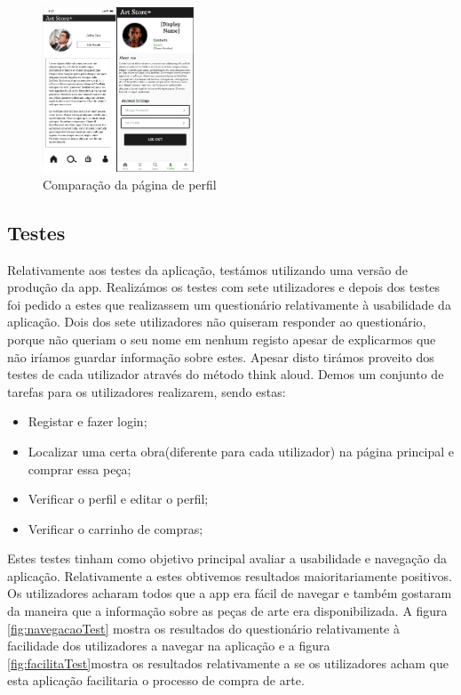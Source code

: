 \documentclass[conference]{IEEEtran}
\begin{document}
\begin{figure}[h]
    \centering
    \includegraphics[width=0.4\textwidth]{profile-early-vs-latest.png}
    \caption{Comparação da página de perfil}
    \label{fig:profilevs}
\end{figure}

\subsection{Testes}

Relativamente aos testes da aplicação, testámos utilizando uma versão de produção da app. 
Realizámos os testes com sete utilizadores e depois dos testes foi pedido a estes que 
realizassem um questionário relativamente à usabilidade da aplicação. 
Dois dos sete utilizadores não quiseram responder ao questionário, 
porque não queriam o seu nome em nenhum registo apesar de explicarmos que 
não iríamos guardar informação sobre estes. Apesar disto tirámos proveito 
dos testes de cada utilizador através do método think aloud. Demos um conjunto de 
tarefas para os utilizadores realizarem, sendo estas:

\begin{itemize}
    \item Registar e fazer login;
    \item Localizar uma certa obra(diferente para cada utilizador) na página principal e comprar essa peça;
    \item Verificar o perfil e editar o perfil;
    \item Verificar o carrinho de compras;
\end{itemize}

Estes testes tinham como objetivo principal avaliar a usabilidade e navegação da aplicação. 
Relativamente a estes obtivemos resultados maioritariamente positivos. 
Os utilizadores acharam todos que a app era fácil de navegar e também gostaram da maneira 
que a informação sobre as peças de arte era disponibilizada. A figura
\ref{fig:navegacaoTest} mostra os resultados do questionário relativamente 
à facilidade dos utilizadores a navegar na aplicação e a figura
\ref{fig:facilitaTest}mostra os resultados relativamente a se os utilizadores 
acham que esta aplicação facilitaria o processo de compra de arte.
\end{document}
